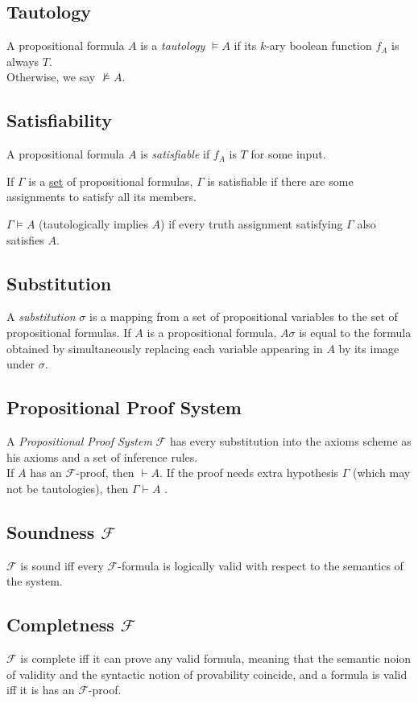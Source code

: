 \documentclass[a4paper]{article}
\newcommand\vdashsub[1]{\mathrel{\stackengine{.4ex}{\vdash}{\;\;\scriptscriptstyle#1}{U}{c}{F}{T}{L}}}
\begin{document}
\subsection{Tautology}

A propositional formula \(A\) is a \textit{tautology} \(\vDash A\) if its \(k\)-ary boolean
function \(f_A\) is always \(T\). \\
Otherwise, we say \(\nvDash A\).

\subsection{Satisfiability}

A propositional formula \(A\) is \textit{satisfiable}
if \(f_A\) is \(T\) for some input.

If \(\Gamma\) is a \underline{set} of propositional formulas, \(\Gamma\)
is satisfiable if there are some assignments to satisfy all its members.

\(\Gamma \vDash A\) (tautologically implies \(A\))
if every truth assignment satisfying \(\Gamma\)
also satisfies \(A\).

\subsection{Substitution}

A \textit{substitution} \(\sigma\)
is a mapping from a set of propositional variables
to the set of propositional formulas.
If \(A\) is a propositional formula, \(A\sigma\)
is equal to the formula obtained by simultaneously
replacing each variable appearing in \(A\)
by its image under \(\sigma\).

\subsection{Propositional Proof System}

A \textit{Propositional Proof System}
\(\mathcal{F}\) has every substitution into the
axioms scheme as his axioms and a set of inference rules.
\\
If \(A\) has an \(\mathcal{F}\)-proof,
then \(\vdash A\). %
If the proof needs extra hypothesis \(\Gamma\)
(which may not be tautologies), then \(\Gamma\vdash A\)
.%

\subsection{Soundness \(\mathcal{F}\)}

\(\mathcal{F}\) is sound iff every \(\mathcal{F}\)-formula is logically valid with respect to the semantics of the system. 

\subsection{Completness \(\mathcal{F}\)}

\(\mathcal{F}\) is complete iff
it can prove any valid formula, meaning that
the semantic noion of validity
and the syntactic notion of provability coincide,
and a formula is valid iff it is has an
\(\mathcal{F}\)-proof.
\end{document}

